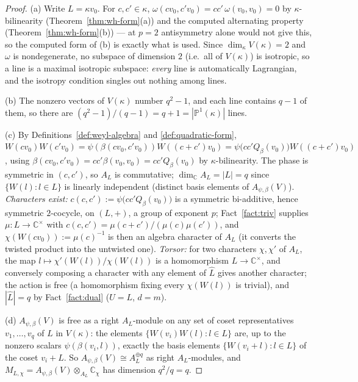 
\begin{proof}
(a) Write $L=\kappa v_0$. For $c,c'\in\kappa$,
$\omega(cv_0,c'v_0)=cc'\,\omega(v_0,v_0)=0$ by $\kappa$-bilinearity
(Theorem~\ref{thm:wh-form}(a)) and the computed alternating property
(Theorem~\ref{thm:wh-form}(b)) — at $p=2$ antisymmetry alone would not give
this, so the computed form of (b) is exactly what is used. Since
$\dim_\kappa V(\kappa)=2$ and $\omega$ is nondegenerate, no subspace of
dimension $2$ (i.e.\ all of $V(\kappa)$) is isotropic, so a line is a maximal
isotropic subspace: \emph{every} line is automatically Lagrangian, and the
isotropy condition singles out nothing among lines.

(b) The nonzero vectors of $V(\kappa)$ number $q^2-1$, and each line contains
$q-1$ of them, so there are $(q^2-1)/(q-1)=q+1=|\mathbb{P}^1(\kappa)|$ lines.

(c) By Definitions~\ref{def:weyl-algebra} and \ref{def:quadratic-form},
$W(cv_0)W(c'v_0)=\psi(\beta(cv_0,c'v_0))W((c+c')v_0)=\psi\big(cc'Q_\beta(v_0)\big)W((c+c')v_0)$,
using $\beta(cv_0,c'v_0)=cc'\beta(v_0,v_0)=cc'Q_\beta(v_0)$ by
$\kappa$-bilinearity. The phase is symmetric in $(c,c')$, so
$A_L$ is commutative; $\dim_{\mathbb{C}}A_L=|L|=q$ since $\{W(l):l\in L\}$ is
linearly independent (distinct basis elements of $A_{\psi,\beta}(V)$).
\emph{Characters exist:} $c(c,c'):=\psi\big(cc'Q_\beta(v_0)\big)$ is a
symmetric bi-additive, hence symmetric $2$-cocycle, on $(L,+)$, a group of
exponent $p$; Fact~\ref{fact:triv} supplies $\mu:L\to\mathbb{C}^\times$ with
$c(c,c')=\mu(c+c')/(\mu(c)\mu(c'))$, and $\chi(W(cv_0)):=\mu(c)^{-1}$ is then
an algebra character of $A_L$ (it converts the twisted product into the
untwisted one). \emph{Torsor:} for two characters $\chi,\chi'$ of $A_L$, the
map $l\mapsto \chi'(W(l))/\chi(W(l))$ is a homomorphism $L\to\mathbb{C}^\times$,
and conversely composing a character with any element of $\hat L$ gives
another character; the action is free (a homomorphism fixing every
$\chi(W(l))$ is trivial), and $|\hat L|=q$ by Fact~\ref{fact:dual}
($U=L$, $d=m$).

(d) $A_{\psi,\beta}(V)$ is free as a right $A_L$-module on any set of coset
representatives $v_1,\dots,v_q$ of $L$ in $V(\kappa)$: the elements
$\{W(v_i)W(l) : l\in L\}$ are, up to the nonzero scalars
$\psi(\beta(v_i,l))$, exactly the basis elements $\{W(v_i+l):l\in L\}$ of the
coset $v_i+L$. So $A_{\psi,\beta}(V)\cong A_L^{\oplus q}$ as right
$A_L$-modules, and $M_{L,\chi}=A_{\psi,\beta}(V)\otimes_{A_L}\mathbb{C}_\chi$
has dimension $q^2/q=q$.


\end{proof}
